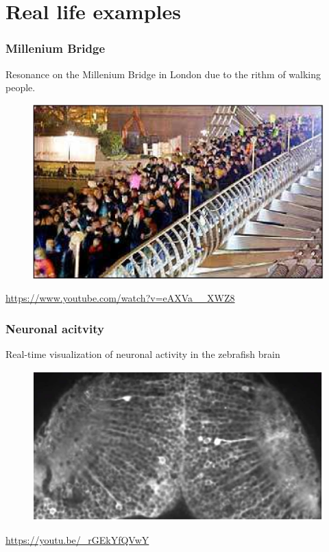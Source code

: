 \section{Real life examples} 

\begin{frame}
	\frametitle{Millenium Bridge}
	Resonance on the Millenium Bridge in London due to the rithm of walking people.
	\begin{figure}
		\includegraphics[scale=0.3]{millenium_bridge}
	\end{figure}
	\url{https://www.youtube.com/watch?v=eAXVa__XWZ8}
\end{frame}

\begin{frame}
	\frametitle{Neuronal acitvity}
	Real-time visualization of neuronal activity in the zebrafish brain
	\begin{figure}
		\includegraphics[scale=0.7]{neuronal_activity}
	\end{figure}
	\url{https://youtu.be/_rGEkYfQVwY}
\end{frame}

